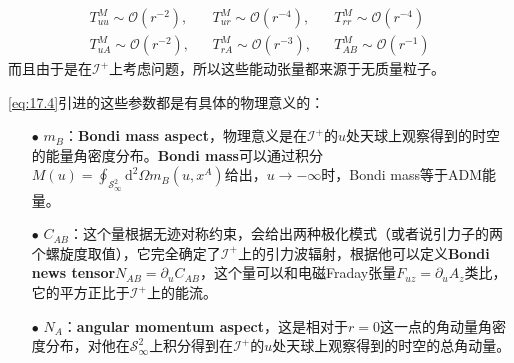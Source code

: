 \begin{align*}
	T^M_{uu}\sim\mathcal{O}(r^{-2}),& &T^M_{ur}\sim\mathcal{O}(r^{-4}),&&T^M_{rr}\sim\mathcal{O}(r^{-4})\\
	T^M_{uA}\sim\mathcal{O}(r^{-2}),&&T^M_{rA}\sim\mathcal{O}(r^{-3}),&&T^M_{AB}\sim\mathcal{O}(r^{-1})
\end{align*}
而且由于是在$\mathcal{I}^+$上考虑问题，所以这些能动张量都来源于无质量粒子。

\ref{eq:17.4}引进的这些参数都是有具体的物理意义的：
\begin{itemize}
	\item[$\bullet$]$m_B$：\textbf{Bondi mass aspect}，物理意义是在$\mathcal{I}^+$的$u$处天球上观察得到的时空的能量角密度分布。\textbf{Bondi mass}可以通过积分$M(u)=\oint_{\mathcal{S}^2_\infty}\mathrm{d}^2\Omega m_B(u,x^A)$给出，$u\to-\infty$时，Bondi mass等于ADM能量。
	\item[$\bullet$]$C_{AB}$：这个量根据无迹对称约束，会给出两种极化模式（或者说引力子的两个螺旋度取值），它完全确定了$\mathcal{I}^+$上的引力波辐射，根据他可以定义\textbf{Bondi news tensor}$N_{AB}=\partial_u C_{AB}$，这个量可以和电磁Fraday张量$F_{uz}=\partial_u A_z$类比，它的平方正比于$\mathcal{I}^+$上的能流。
	\item[$\bullet$]$N_A$：\textbf{angular momentum aspect}，这是相对于$r=0$这一点的角动量角密度分布，对他在$\mathcal{S}^2_\infty$上积分得到在$\mathcal{I}^+$的$u$处天球上观察得到的时空的总角动量。
\end{itemize}

